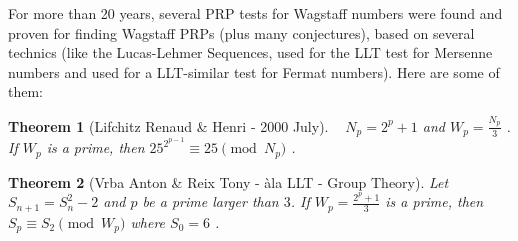 \documentclass[latin1]{quadrature}
\newcommand{\PMod}[1]{\!\!\pmod{#1}}
\newtheorem{theorem}{Theorem}
\newif\ifenfrancais
\begin{document}
\begin{article}
\begin{article}
\ifenfrancais
Depuis plus de 20 ans, plusieurs tests ont \'et\'e trouv\'es et prouv\'es (ou conjectur\'es) afin de d\'ecouvrir de nouveaux PRPs de Wagstaff, en utilisant plusieurs techniques (comme les s\'equences de Lucas ou Lehmer, utilis\'ees pour le test LLT pour les nombres de Mersenne ou pour un test semblable au LLT pour les nombres de Fermat).
Voici les principaux tests :
\else
For more than 20 years, several PRP tests for Wagstaff numbers were found and proven for finding Wagstaff PRPs (plus many conjectures), based on several technics (like the Lucas-Lehmer Sequences, used for the LLT test for Mersenne numbers and used for a LLT-similar test for Fermat numbers).
Here are some of them:
\fi

\vspace{.1in}



\ifenfrancais
\begin{theorem}[Lifchitz Renaud \& Henri - Juillet 2000]
\ 
\newline
Soit $N_p=2^p+1$ et $W_p = \frac{N_p}{3}$ . Si $W_p$ est premier, alors on a : $25^{2^{p-1}} \equiv 25 \PMod{N_p}$ .
\end{theorem}
\else
\begin{theorem}[Lifchitz Renaud \& Henri - 2000 July]
\ 
\newline
$N_p=2^p+1$ and $W_p = \frac{N_p}{3}$ . If $W_p$ is a prime, then $25^{2^{p-1}} \equiv 25 \PMod{N_p}$ .
\end{theorem}
\fi

\vspace{-.1in}

\ifenfrancais
\begin{theorem}[Vrba Anton \& Reix Tony - \`ala LLT - Group Theory - Cycle du DiGraph]
\ 
\newline
Soit $S_{n+1} = S_{n}^2 - 2$ et $p$ premier $\geqslant 3$.
Si $W_p = \frac{2^p+1}{3}$ est premier, alors $S_p \equiv S_2 \PMod{W_p}$
avec $S_0=6$ .
\end{theorem}
\else
\begin{theorem}[Vrba Anton \& Reix Tony - \`ala LLT - Group Theory]
Let $S_{n+1} = S_{n}^2 - 2$ and $p$ be a prime larger than $3$.
If $W_p = \frac{2^p+1}{3}$ is a prime, then $S_p \equiv S_2 \PMod{W_p}$
where $S_0=6$ .
\end{theorem}
\fi

\vspace{-.1in}


\end{article}
\end{article}
\end{document}
